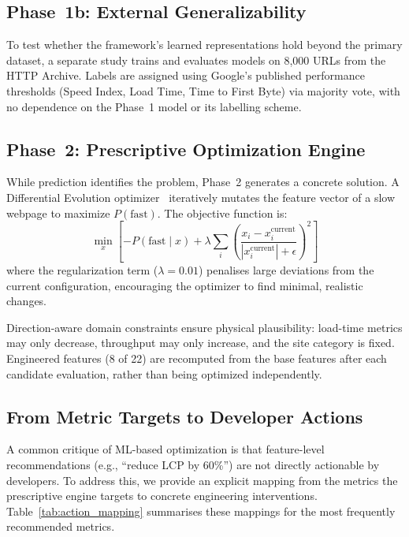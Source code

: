 \documentclass[sn-nature]{sn-jnl}
\begin{document}
\subsection{Phase~1b: External Generalizability}

To test whether the framework's learned representations hold beyond the primary dataset, a separate study trains and evaluates models on 8,000 URLs from the HTTP Archive. Labels are assigned using Google's published performance thresholds (Speed Index, Load Time, Time to First Byte) via majority vote, with no dependence on the Phase~1 model or its labelling scheme.

\subsection{Phase~2: Prescriptive Optimization Engine}

While prediction identifies the problem, Phase~2 generates a concrete solution. A Differential Evolution optimizer~\cite{asha2025} iteratively mutates the feature vector of a slow webpage to maximize $P(\text{fast})$. The objective function is:
\[
\min_{x}\left[-P(\text{fast} \mid x) + \lambda \sum_i \left(\frac{x_i - x_i^{\text{current}}}{|x_i^{\text{current}}| + \epsilon}\right)^{\!2}\right]
\]
where the regularization term ($\lambda = 0.01$) penalises large deviations from the current configuration, encouraging the optimizer to find minimal, realistic changes.

Direction-aware domain constraints ensure physical plausibility: load-time metrics may only decrease, throughput may only increase, and the site category is fixed. Engineered features (8 of 22) are recomputed from the base features after each candidate evaluation, rather than being optimized independently.

\subsection{From Metric Targets to Developer Actions}

A common critique of ML-based optimization is that feature-level recommendations (e.g., ``reduce LCP by 60\%'') are not directly actionable by developers. To address this, we provide an explicit mapping from the metrics the prescriptive engine targets to concrete engineering interventions. Table~\ref{tab:action_mapping} summarises these mappings for the most frequently recommended metrics.
\end{document}
